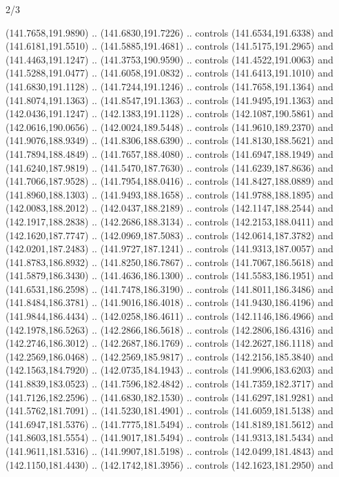 \begin{flagdescription}{2/3}
\begin{scope}[shift={(0.5\flaglength,0.5)},scale=\flagwidth/320]
\begin{scope}[y=0.8pt, x=0.8pt, yscale=-1,shift={(-118.3,-146)}]
  (141.7658,191.9890) .. (141.6830,191.7226) .. controls (141.6534,191.6338) and
  (141.6181,191.5510) .. (141.5885,191.4681) .. controls (141.5175,191.2965) and
  (141.4463,191.1247) .. (141.3753,190.9590) .. controls (141.4522,191.0063) and
  (141.5288,191.0477) .. (141.6058,191.0832) .. controls (141.6413,191.1010) and
  (141.6830,191.1128) .. (141.7244,191.1246) .. controls (141.7658,191.1364) and
  (141.8074,191.1363) .. (141.8547,191.1363) .. controls (141.9495,191.1363) and
  (142.0436,191.1247) .. (142.1383,191.1128) .. controls (142.1087,190.5861) and
  (142.0616,190.0656) .. (142.0024,189.5448) .. controls (141.9610,189.2370) and
  (141.9076,188.9349) .. (141.8306,188.6390) .. controls (141.8130,188.5621) and
  (141.7894,188.4849) .. (141.7657,188.4080) .. controls (141.6947,188.1949) and
  (141.6240,187.9819) .. (141.5470,187.7630) .. controls (141.6239,187.8636) and
  (141.7066,187.9528) .. (141.7954,188.0416) .. controls (141.8427,188.0889) and
  (141.8960,188.1303) .. (141.9493,188.1658) .. controls (141.9788,188.1895) and
  (142.0083,188.2012) .. (142.0437,188.2189) .. controls (142.1147,188.2544) and
  (142.1917,188.2838) .. (142.2686,188.3134) .. controls (142.2153,188.0411) and
  (142.1620,187.7747) .. (142.0969,187.5083) .. controls (142.0614,187.3782) and
  (142.0201,187.2483) .. (141.9727,187.1241) .. controls (141.9313,187.0057) and
  (141.8783,186.8932) .. (141.8250,186.7867) .. controls (141.7067,186.5618) and
  (141.5879,186.3430) .. (141.4636,186.1300) .. controls (141.5583,186.1951) and
  (141.6531,186.2598) .. (141.7478,186.3190) .. controls (141.8011,186.3486) and
  (141.8484,186.3781) .. (141.9016,186.4018) .. controls (141.9430,186.4196) and
  (141.9844,186.4434) .. (142.0258,186.4611) .. controls (142.1146,186.4966) and
  (142.1978,186.5263) .. (142.2866,186.5618) .. controls (142.2806,186.4316) and
  (142.2746,186.3012) .. (142.2687,186.1769) .. controls (142.2627,186.1118) and
  (142.2569,186.0468) .. (142.2569,185.9817) .. controls (142.2156,185.3840) and
  (142.1563,184.7920) .. (142.0735,184.1943) .. controls (141.9906,183.6203) and
  (141.8839,183.0523) .. (141.7596,182.4842) .. controls (141.7359,182.3717) and
  (141.7126,182.2596) .. (141.6830,182.1530) .. controls (141.6297,181.9281) and
  (141.5762,181.7091) .. (141.5230,181.4901) .. controls (141.6059,181.5138) and
  (141.6947,181.5376) .. (141.7775,181.5494) .. controls (141.8189,181.5612) and
  (141.8603,181.5554) .. (141.9017,181.5494) .. controls (141.9313,181.5434) and
  (141.9611,181.5316) .. (141.9907,181.5198) .. controls (142.0499,181.4843) and
  (142.1150,181.4430) .. (142.1742,181.3956) .. controls (142.1623,181.2950) and

\end{scope}
\end{scope}
\end{flagdescription}
